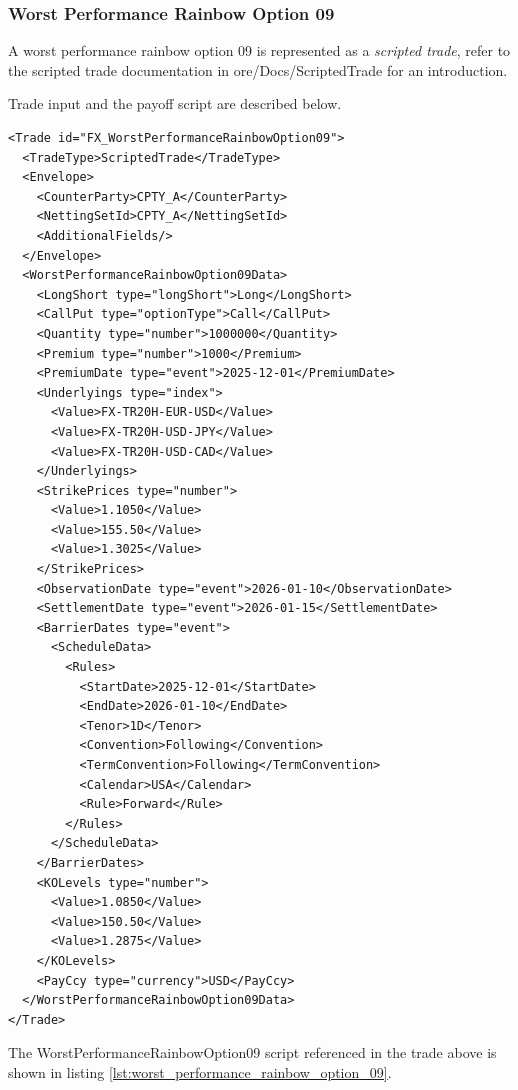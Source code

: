 \subsubsection*{Worst Performance Rainbow Option 09}

A worst performance rainbow option 09 is represented as a {\em scripted trade},
refer to the scripted trade documentation in ore/Docs/ScriptedTrade
for an introduction.

Trade input and the payoff script are described below.

\begin{verbatim}
<Trade id="FX_WorstPerformanceRainbowOption09">
  <TradeType>ScriptedTrade</TradeType>
  <Envelope>
    <CounterParty>CPTY_A</CounterParty>
    <NettingSetId>CPTY_A</NettingSetId>
    <AdditionalFields/>
  </Envelope>
  <WorstPerformanceRainbowOption09Data>
    <LongShort type="longShort">Long</LongShort>
    <CallPut type="optionType">Call</CallPut>
    <Quantity type="number">1000000</Quantity>
    <Premium type="number">1000</Premium>
    <PremiumDate type="event">2025-12-01</PremiumDate>
    <Underlyings type="index">
      <Value>FX-TR20H-EUR-USD</Value>
      <Value>FX-TR20H-USD-JPY</Value>
      <Value>FX-TR20H-USD-CAD</Value>
    </Underlyings>
    <StrikePrices type="number">
      <Value>1.1050</Value>
      <Value>155.50</Value>
      <Value>1.3025</Value>
    </StrikePrices>
    <ObservationDate type="event">2026-01-10</ObservationDate>
    <SettlementDate type="event">2026-01-15</SettlementDate>
    <BarrierDates type="event">
      <ScheduleData>
        <Rules>
          <StartDate>2025-12-01</StartDate>
          <EndDate>2026-01-10</EndDate>
          <Tenor>1D</Tenor>
          <Convention>Following</Convention>
          <TermConvention>Following</TermConvention>
          <Calendar>USA</Calendar>
          <Rule>Forward</Rule>
        </Rules>
      </ScheduleData>
    </BarrierDates>
    <KOLevels type="number">
      <Value>1.0850</Value>
      <Value>150.50</Value>
      <Value>1.2875</Value>
    </KOLevels>
    <PayCcy type="currency">USD</PayCcy>
  </WorstPerformanceRainbowOption09Data>
</Trade>
\end{verbatim}

The WorstPerformanceRainbowOption09 script referenced in the trade above is shown in listing
\ref{lst:worst_performance_rainbow_option_09}.

